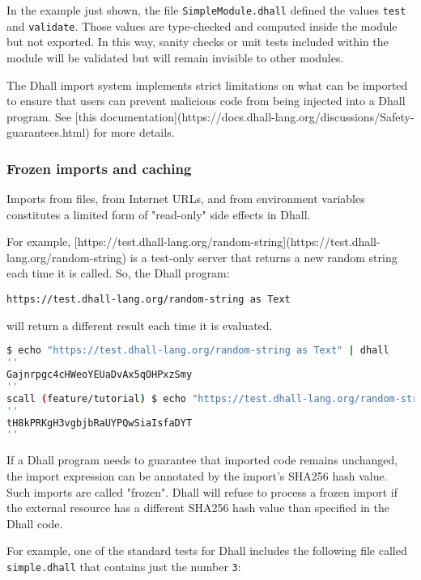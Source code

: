In the example just shown, the file \lstinline!SimpleModule.dhall! defined the values \lstinline!test! and \lstinline!validate!.
Those values are type-checked and computed inside the module but not exported.
In this way, sanity checks or unit tests included within the module will be validated but will remain invisible to other modules.


The Dhall import system implements strict limitations on what can be imported to ensure that users can prevent malicious code from being injected into a Dhall program.
See [this documentation](https://docs.dhall-lang.org/discussions/Safety-guarantees.html) for more details.


\subsubsection{Frozen imports and caching}


Imports from files, from Internet URLs, and from environment variables constitutes a limited form of "read-only" side effects in Dhall.


For example, [https://test.dhall-lang.org/random-string](https://test.dhall-lang.org/random-string) is a test-only server that returns a new random string each time it is called.
So, the Dhall program:


\begin{lstlisting}[language=Dhall]
https://test.dhall-lang.org/random-string as Text
\end{lstlisting}


will return a different result each time it is evaluated.


\begin{lstlisting}[language=Bash]
$ echo "https://test.dhall-lang.org/random-string as Text" | dhall
''
Gajnrpgc4cHWeoYEUaDvAx5qOHPxzSmy
''
scall (feature/tutorial) $ echo "https://test.dhall-lang.org/random-string as Text" | dhall
''
tH8kPRKgH3vgbjbRaUYPQwSiaIsfaDYT
''
\end{lstlisting}


If a Dhall program needs to guarantee that imported code remains unchanged, the import expression can be annotated by the import's SHA256 hash value.
Such imports are called "frozen".
Dhall will refuse to process a frozen import if the external resource has a different SHA256 hash value than specified in the Dhall code.


For example, one of the standard tests for Dhall includes the following file called \lstinline!simple.dhall! that contains just the number \lstinline!3!:


